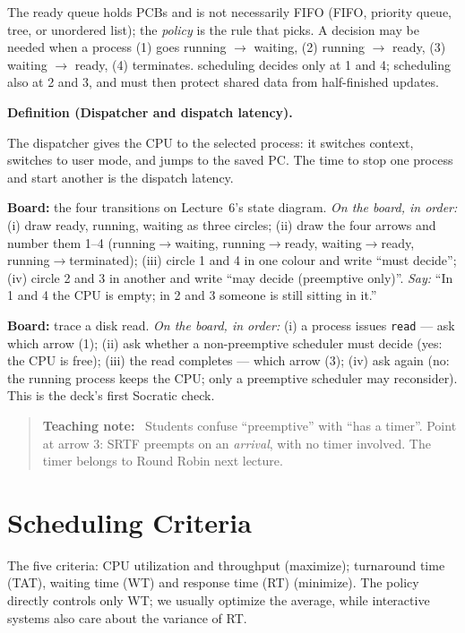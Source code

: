 \documentclass[11pt]{article}
\newenvironment{definitionbox}[1]{%
  \par\noindent\textbf{Definition (#1).}\ \itshape
}{\par\vspace{0.3em}}
\newenvironment{teachingaside}{\begin{quote}\small\color{primary-gold}\textbf{Teaching note:}\ }{\end{quote}}
\begin{document}
The ready queue holds PCBs and is not necessarily FIFO (FIFO, priority queue, tree, or unordered list); the \emph{policy} is the rule that picks. A decision may be needed when a process (1) goes running $\to$ waiting, (2) running $\to$ ready, (3) waiting $\to$ ready, (4) terminates.  scheduling decides only at 1 and 4;  scheduling also at 2 and 3, and must then protect shared data from half-finished updates.

\begin{definitionbox}{Dispatcher and dispatch latency}
The dispatcher gives the CPU to the selected process: it switches context, switches to user mode, and jumps to the saved PC. The time to stop one process and start another is the dispatch latency.
\end{definitionbox}

\textbf{Board:} the four transitions on Lecture~6's state diagram. \emph{On the board, in order:} (i) draw ready, running, waiting as three circles; (ii) draw the four arrows and number them 1--4 (running$\to$waiting, running$\to$ready, waiting$\to$ready, running$\to$terminated); (iii) circle 1 and 4 in one colour and write ``must decide''; (iv) circle 2 and 3 in another and write ``may decide (preemptive only)''. \emph{Say:} ``In 1 and 4 the CPU is empty; in 2 and 3 someone is still sitting in it.''

\textbf{Board:} trace a disk read. \emph{On the board, in order:} (i) a process issues \texttt{read} --- ask which arrow (1); (ii) ask whether a non-preemptive scheduler must decide (yes: the CPU is free); (iii) the read completes --- which arrow (3); (iv) ask again (no: the running process keeps the CPU; only a preemptive scheduler may reconsider). This is the deck's first Socratic check.

\begin{teachingaside}
Students confuse ``preemptive'' with ``has a timer''. Point at arrow 3: SRTF preempts on an \emph{arrival}, with no timer involved. The timer belongs to Round Robin next lecture.
\end{teachingaside}

\section{Scheduling Criteria}

The five criteria: CPU utilization and throughput (maximize); turnaround time (TAT), waiting time (WT) and response time (RT) (minimize). The policy directly controls only WT; we usually optimize the average, while interactive systems also care about the variance of RT.
\end{document}

